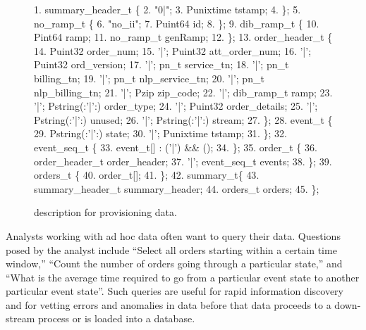\begin{figure}
\begin{small}
\begin{code}
{ 1}.   summary\_header\_t \{
{ 2}.  "0|";
{ 3}.  Punixtime tstamp;
{ 4}. \};
\mbox{}
{ 5}.  no\_ramp\_t \{
{ 6}.  "no\_ii";
{ 7}.  Puint64 id;
{ 8}. \};
\mbox{}
{ 9}.  dib\_ramp\_t \{
{10}.   Pint64     ramp;
{11}.   no\_ramp\_t  genRamp;
{12}. \};
\mbox{}
{13}.  order\_header\_t \{
{14}.        Puint32             order\_num;
{15}.  '|';  Puint32             att\_order\_num;
{16}.  '|';  Puint32             ord\_version;
{17}.  '|';   pn\_t           service\_tn;
{18}.  '|';   pn\_t           billing\_tn;
{19}.  '|';   pn\_t           nlp\_service\_tn;
{20}.  '|';   pn\_t           nlp\_billing\_tn;
{21}.  '|';   Pzip           zip\_code;
{22}.  '|';  dib\_ramp\_t          ramp;
{23}.  '|';  Pstring(:'|':)      order\_type;
{24}.  '|';  Puint32             order\_details;
{25}.  '|';  Pstring(:'|':)      unused;
{26}.  '|';  Pstring(:'|':)      stream;
{27}. \};
\mbox{}
{28}.  event\_t \{
{29}.        Pstring(:'|':)    state;   
{30}.   '|'; Punixtime         tstamp;
{31}. \};
\mbox{}
{32}.  event\_seq\_t \{
{33}.   event\_t[] : ('|') && ();
{34}. \};
\mbox{}
{35}.   order\_t \{
{36}.        order\_header\_t  order\_header;
{37}.   '|'; event\_seq\_t     events;
{38}. \};
\mbox{}
{39}.  orders\_t \{
{40}.   order\_t[];
{41}. \};
\mbox{}
{42}.   summary\_t\{
{43}.   summary\_header\_t  summary\_header;
{44}.   orders\_t          orders;
{45}. \};
\end{code}
\end{small}
\caption{\pads{} description for \dibbler{} provisioning data.}
\label{figure:dibbler}
\end{figure}

Analysts working with ad hoc data often want to query their data.  
Questions posed by the \dibbler{} analyst include ``Select all
orders starting within a certain time window,'' ``Count the number of
orders going through a particular state,'' and ``What is the average
time required to go from a particular event state to another
particular event state''.  Such queries are useful for rapid
information discovery and for vetting errors and anomalies in data
before that data proceeds to a down-stream process or is loaded into a 
database.

